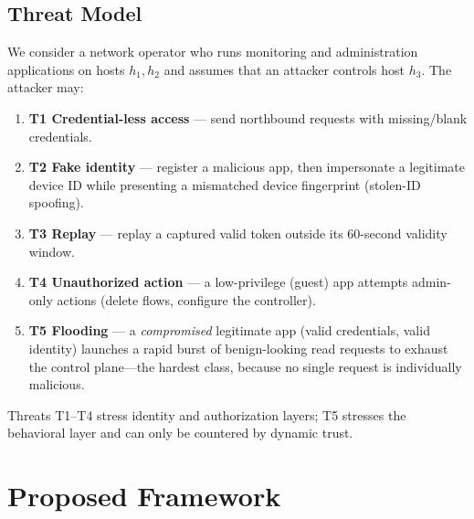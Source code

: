 \documentclass[journal]{IEEEtran}
\begin{document}
\subsection{Threat Model}
We consider a network operator who runs monitoring and administration applications on hosts $h_1,h_2$ and assumes that an attacker controls host $h_3$. The attacker may:
\begin{enumerate}
\item \textbf{T1 Credential-less access} --- send northbound requests with missing/blank credentials.
\item \textbf{T2 Fake identity} --- register a malicious app, then impersonate a legitimate device ID while presenting a mismatched device fingerprint (stolen-ID spoofing).
\item \textbf{T3 Replay} --- replay a captured valid token outside its 60-second validity window.
\item \textbf{T4 Unauthorized action} --- a low-privilege (guest) app attempts admin-only actions (delete flows, configure the controller).
\item \textbf{T5 Flooding} --- a \emph{compromised} legitimate app (valid credentials, valid identity) launches a rapid burst of benign-looking read requests to exhaust the control plane---the hardest class, because no single request is individually malicious.
\end{enumerate}
Threats T1--T4 stress identity and authorization layers; T5 stresses the behavioral layer and can only be countered by dynamic trust.

\section{Proposed Framework}
\end{document}
